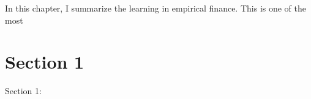 \minitoc

\vspace{0.5cm}

In this chapter, I summarize the learning in empirical finance.
This is one of the most 

\section{Section 1}
Section 1: